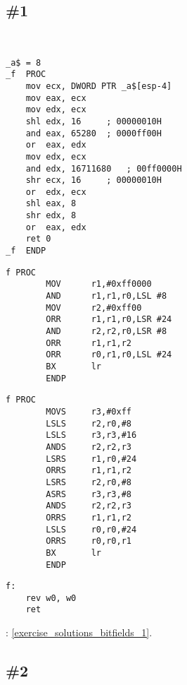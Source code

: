 \section{\Exercises}

\subsection{\Exercise \#1}
\label{exercise_bitfields_1}

\WhatThisCodeDoes\

\begin{lstlisting}[caption=\Optimizing MSVC 2010]
_a$ = 8
_f	PROC
	mov	ecx, DWORD PTR _a$[esp-4]
	mov	eax, ecx
	mov	edx, ecx
	shl	edx, 16		; 00000010H
	and	eax, 65280	; 0000ff00H
	or	eax, edx
	mov	edx, ecx
	and	edx, 16711680	; 00ff0000H
	shr	ecx, 16		; 00000010H
	or	edx, ecx
	shl	eax, 8
	shr	edx, 8
	or	eax, edx
	ret	0
_f	ENDP
\end{lstlisting}

\begin{lstlisting}[caption=\OptimizingKeilVI (\ARMMode)]
f PROC
        MOV      r1,#0xff0000
        AND      r1,r1,r0,LSL #8
        MOV      r2,#0xff00
        ORR      r1,r1,r0,LSR #24
        AND      r2,r2,r0,LSR #8
        ORR      r1,r1,r2
        ORR      r0,r1,r0,LSL #24
        BX       lr
        ENDP
\end{lstlisting}

\begin{lstlisting}[caption=\OptimizingKeilVI (\ThumbMode)]
f PROC
        MOVS     r3,#0xff
        LSLS     r2,r0,#8
        LSLS     r3,r3,#16
        ANDS     r2,r2,r3
        LSRS     r1,r0,#24
        ORRS     r1,r1,r2
        LSRS     r2,r0,#8
        ASRS     r3,r3,#8
        ANDS     r2,r2,r3
        ORRS     r1,r1,r2
        LSLS     r0,r0,#24
        ORRS     r0,r0,r1
        BX       lr
        ENDP
\end{lstlisting}

\begin{lstlisting}[caption=\Optimizing GCC 4.9 (ARM64)]
f:
	rev	w0, w0
	ret
\end{lstlisting}

\Answer{}: \ref{exercise_solutions_bitfields_1}.

\subsection{\Exercise \#2}
\label{exercise_bitfields_2}

\WhatThisCodeDoes\

